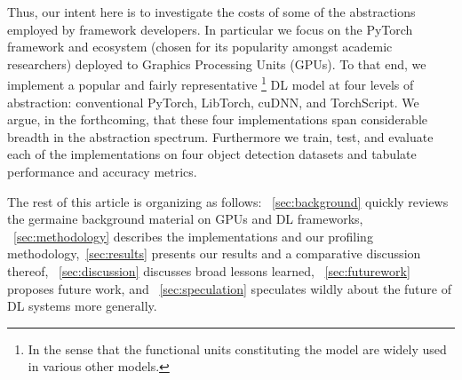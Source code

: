 Thus, our intent here is to investigate the costs of some of the abstractions employed by framework developers.
In particular we focus on the PyTorch framework and ecosystem (chosen for its popularity amongst academic researchers) deployed to Graphics Processing Units (GPUs).
To that end, we implement a popular and fairly representative%
\footnote{In the sense that the functional units constituting the model are widely used in various other models.}
DL model at four levels of abstraction: conventional PyTorch, LibTorch, cuDNN, and TorchScript.
We argue, in the forthcoming, that these four implementations span considerable breadth in the abstraction spectrum.
Furthermore we train, test, and evaluate each of the implementations on four object detection datasets and tabulate performance and accuracy metrics.

The rest of this article is organizing as follows: ~\cref{sec:background} quickly reviews the germaine background material on GPUs and DL frameworks, ~\cref{sec:methodology} describes the implementations and our profiling methodology,~\cref{sec:results} presents our results and a comparative discussion thereof, ~\cref{sec:discussion} discusses broad lessons learned, ~\cref{sec:futurework} proposes future work, and ~\cref{sec:speculation} speculates wildly about the future of DL systems more generally.

